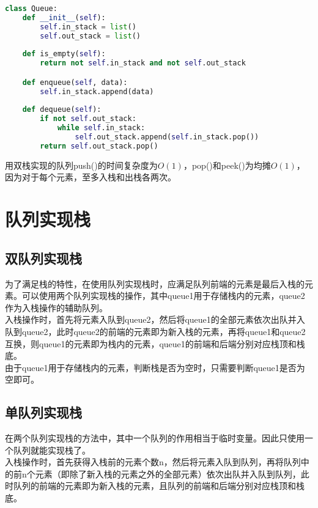 \begin{lstlisting}[language=Python]
class Queue:
    def __init__(self):
        self.in_stack = list()
        self.out_stack = list()
    
    def is_empty(self):
        return not self.in_stack and not self.out_stack

    def enqueue(self, data):
        self.in_stack.append(data)
    
    def dequeue(self):
        if not self.out_stack:
            while self.in_stack:
                self.out_stack.append(self.in_stack.pop())
        return self.out_stack.pop()
\end{lstlisting}

用双栈实现的队列push()的时间复杂度为$ O(1) $，pop()和peek()为均摊$ O(1) $，因为对于每个元素，至多入栈和出栈各两次。

\newpage

\section{队列实现栈}

\subsection{双队列实现栈}

为了满足栈的特性，在使用队列实现栈时，应满足队列前端的元素是最后入栈的元素。可以使用两个队列实现栈的操作，其中queue1用于存储栈内的元素，queue2作为入栈操作的辅助队列。\\

入栈操作时，首先将元素入队到queue2，然后将queue1的全部元素依次出队并入队到queue2，此时queue2的前端的元素即为新入栈的元素，再将queue1和queue2互换，则queue1的元素即为栈内的元素，queue1的前端和后端分别对应栈顶和栈底。\\

由于queue1用于存储栈内的元素，判断栈是否为空时，只需要判断queue1是否为空即可。\\

\subsection{单队列实现栈}

在两个队列实现栈的方法中，其中一个队列的作用相当于临时变量。因此只使用一个队列就能实现栈了。\\

入栈操作时，首先获得入栈前的元素个数n，然后将元素入队到队列，再将队列中的前n个元素（即除了新入栈的元素之外的全部元素）依次出队并入队到队列，此时队列的前端的元素即为新入栈的元素，且队列的前端和后端分别对应栈顶和栈底。\\

